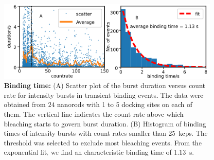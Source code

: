 \begin{figure}[ht]
	\centering
	\includegraphics[width=\textwidth]{countrate_vs_duration_nophtns}
	\caption{\textbf{Binding time:} (A) Scatter plot of the burst duration versus count rate for intensity bursts in transient binding events. The data were obtained from $24$ nanorods with 1 to 5 docking sites on each of them. The vertical line indicates the count rate above which bleaching starts to govern burst duration.
	(B) Histogram of binding times of intensity bursts with count rates smaller than \SI{25}{ kcps}. The threshold was selected to exclude most bleaching events. From the exponential fit, we find an characteristic binding time of \SI{1.13}{\s}.}
  	\label{fig:countrate_vs_duration}
\end{figure}


